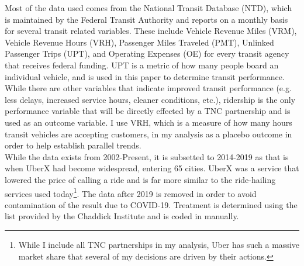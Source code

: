 \documentclass [12pt]{report}
\begin{document}
Most of the data used comes from the National Transit Database (NTD), which  is maintained by the Federal Transit Authority and reports on a monthly basis for several transit related variables. These include Vehicle Revenue Miles (VRM), Vehicle Revenue Hours (VRH), Passenger Miles Traveled (PMT), Unlinked Passenger Trips (UPT), and Operating Expenses (OE) for every transit agency that receives federal funding. UPT is a metric of how many people board an individual vehicle, and is used in this paper to determine transit performance. While there are other variables that indicate improved transit performance (e.g. less delays, increased service hours, cleaner conditions, etc.), ridership is the only performance variable that will be directly effected by a TNC partnership and is used as an outcome variable. I use VRH, which is a measure of how many hours transit vehicles are accepting customers, in my analysis as a placebo outcome in order to help establish parallel trends. \\
\indent While the data exists from 2002-Present, it is subsetted to 2014-2019 as that is when UberX had become widespread, entering 65 cities. UberX was a service that lowered the price of calling a ride and is far more similar to the ride-hailing services used today\footnote{While I include all TNC partnerships in my analysis, Uber has such a massive market share that several of my decisions are driven by their actions.}. The data after 2019 is removed in order to avoid contamination of the result due to COVID-19. Treatment is determined using the list provided by the Chaddick Institute \parencite{depaul} and is coded in manually.
\begin{table}[H] \centering \renewcommand*{\arraystretch}{1.1}\caption{Summary statistics for NTD data}
\end{table}
\end{document}
